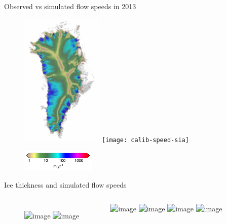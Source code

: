 \documentclass[hide notes,intlimits]{beamer}
\begin{document}
\begin{frame}{Observed vs simulated flow speeds in 2013}
    \begin{figure}
      \includegraphics[width=0.35\textwidth]{greenland-exp-overview-oldbed}
      \texttt{[image: calib-speed-sia]}
    \end{figure}
    \vspace{-0.5em}
    \begin{figure}
      \includegraphics[height=1cm]{colorbar-speed}
    \end{figure}
\end{frame}


\begin{frame}{Ice thickness and simulated flow speeds}
\vspace{-0.74em}
  \begin{columns}
    \column[c]{5cm}
    \begin{figure}
      \includegraphics<1-2>[width=\textwidth]{greenland-obs-basal-overview}
      \includegraphics<3-4>[width=\textwidth]{greenland-obs-basal-overview-mo14}
    \end{figure}
    \column[c]{5cm}
    \includegraphics<1>[width=\textwidth]{jakobshavn-bed-5000m-ba01}
    \includegraphics<2>[width=\textwidth]{jakobshavn-speed-exp-4500m-ba01}
    \includegraphics<3>[width=\textwidth]{jakobshavn-bed-mo14}
    \includegraphics<4>[width=\textwidth]{jakobshavn-speed-exp-600-v1.2-no-scale-no-gate}
  \end{columns}
\end{frame}
\end{document}
